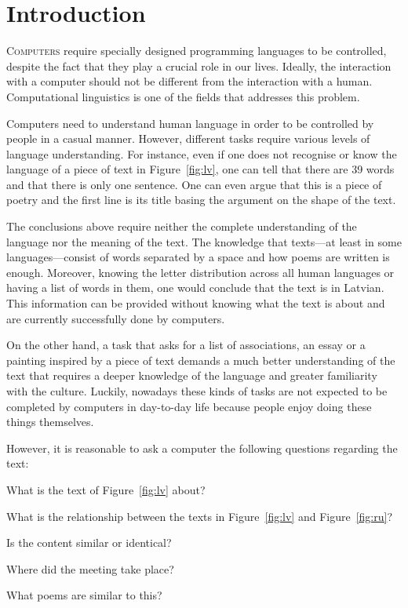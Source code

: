 \chapter{Introduction}
\label{ch:introduction}

\lettrine[lines=5,loversize=0.25]{C}{omputers} require specially designed programming languages to be controlled, despite the fact that they play a crucial role in our lives. Ideally, the interaction with a computer should not be different from the interaction with a human. Computational linguistics is one of the fields that addresses this problem.

Computers need to understand human language in order to be controlled by people in a casual manner. However, different tasks require various levels of language understanding. For instance, even if one does not recognise or know the language of a piece of text in Figure~\ref{fig:lv}, one can tell that there are 39 words and that there is only one sentence. One can even argue that this is a piece of poetry and the first line is its title basing the argument on the shape of the text.

The conclusions above require neither the complete understanding of the language nor the meaning of the text. The knowledge that texts---at least in some languages---consist of words separated by a space and how poems are written is enough. Moreover, knowing the letter distribution across all human languages or having a list of words in them, one would conclude that the text is in Latvian. This information can be provided without knowing what the text is about and are currently successfully done by computers.



On the other hand, a task that asks for a list of associations, an essay or a painting inspired by a piece of text demands a much better understanding of the text that requires a deeper knowledge of the language and greater familiarity with the culture. Luckily, nowadays these kinds of tasks are not expected to be completed by computers in day-to-day life because people enjoy doing these things themselves.

However, it is reasonable to ask a computer the following questions regarding the text:
\begin{inparaenum}[a)]
\item What is the text of Figure~\ref{fig:lv} about?
\item What is the relationship between the texts in Figure~\ref{fig:lv} and
  Figure~\ref{fig:ru}?
\item Is the content similar or identical?
\item Where did the meeting take place?
\item What poems are similar to this?
\end{inparaenum}


